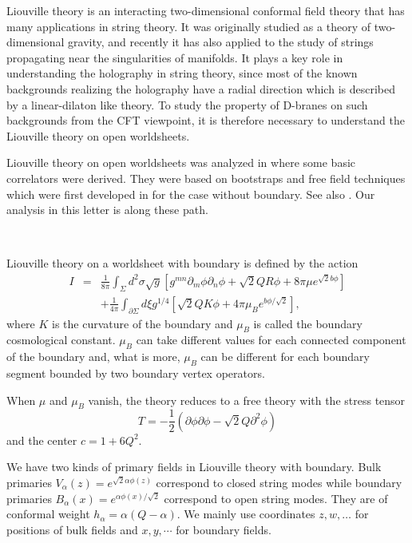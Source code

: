 \documentclass[a4paper,11pt]{article}
\begin{document}


   Liouville theory is an interacting two-dimensional
 conformal field theory that has many applications in string theory.
 It was originally studied as a theory of two-dimensional gravity,
 and recently it has also applied to the study of strings propagating
 near the singularities of manifolds.
 It plays a key role in understanding the holography in string theory,
 since most of the known backgrounds realizing the holography
 have a radial direction which is described by a linear-dilaton like
 theory.
 To study the property of D-branes on such backgrounds from the CFT
 viewpoint, it is therefore necessary to understand the Liouville
 theory on open worldsheets.

   Liouville theory on open worldsheets was analyzed in \cite{FZZ, ZZ}
 where some basic correlators were derived.
 They were based on bootstraps and free field techniques which were
 first developed in \cite{DO,ZZ2,T} for the case without boundary.
 See also \cite{PT,T2,T3}.
 Our analysis in this letter is along these path.

~

   Liouville theory on a worldsheet with boundary is defined by
 the action
\begin{eqnarray}
  I&=&\frac{1}{8\pi}\int_\Sigma d^2\sigma \sqrt{g}
     \left[g^{mn}\partial_m\phi\partial_n\phi
    +\sqrt{2}QR\phi+8\pi\mu e^{\sqrt{2}b\phi}\right]
  \nonumber \\ &&
    +\frac{1}{4\pi}\int_{\partial\Sigma}d\xi g^{1/4}
     \left[\sqrt{2}QK\phi+4\pi\mu_B e^{b\phi/\sqrt{2}}\right] ,
\end{eqnarray}
 where $K$ is the curvature of the boundary and $\mu_B$ is
 called the boundary cosmological constant.
 $\mu_B$ can take different values for each connected component of
 the boundary and, what is more, $\mu_B$ can be different for
 each boundary segment bounded by two boundary vertex operators.

   When $\mu$ and $\mu_B$ vanish, the theory reduces to a free theory
 with the stress tensor
\begin{equation}
  T = -\frac{1}{2}(\partial\phi\partial\phi-\sqrt{2}Q\partial^2\phi)
\end{equation}
 and the center $c=1+6Q^2$.

   We have two kinds of primary fields in Liouville theory with boundary.
 Bulk primaries $V_\alpha(z)=e^{\sqrt{2}\alpha\phi(z)}$ correspond
 to closed string modes while boundary primaries
 $B_\alpha(x)=e^{\alpha\phi(x)/\sqrt{2}}$ correspond to open string modes.
 They are of conformal weight $h_\alpha=\alpha(Q-\alpha)$.
 We mainly use coordinates $z,w,\ldots$ for positions of bulk fields
 and $x,y,\cdots$ for boundary fields.
\end{document}
